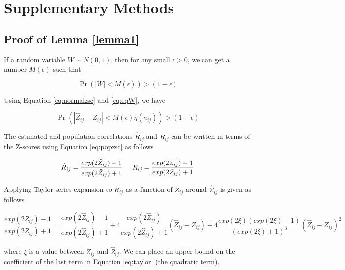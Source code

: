 \section*{Supplementary Methods}

\subsection{Proof of Lemma \ref{lemma1}}

If a random variable $W \sim N \left ( 0, 1 \right) $, then for any small $\epsilon > 0$, we can get a number $M(\epsilon)$ such that 

\begin{equation}\label{eq:eqW}
    \Pr \left ( |W| < M(\epsilon) \right) > (1 - \epsilon)
\end{equation}

Using Equation \ref{eq:normalzsc} and \ref{eq:eqW}, we have 

\begin{equation}\label{eq:zM}
   \Pr \left ( |\hat{Z}_{ij} - Z_{ij} | < M(\epsilon) \eta(n_{ij}) \right) > \left ( 1 - \epsilon \right)
\end{equation}

The estimated and population correlations $\hat{R}_{ij}$ and $R_{ij}$ can be written in terms of the Z-scores using Equation \ref{eq:popzsc} as follows

\begin{equation}\label{eq:Rbound}
    \hat{R}_{ij} =  \frac{exp(2 \hat{Z}_{ij}) - 1 }{exp(2 \hat{Z}_{ij}) + 1} \hspace{0.5 cm} R_{ij} = \frac{exp(2 Z_{ij}) - 1 }{exp(2 Z_{ij}) + 1}
\end{equation}

Applying Taylor series expansion to $R_{ij}$ as a function of $Z_{ij}$ around $\hat{Z}_{ij}$ is given as follows 

\begin{equation}\label{eq:taylor}
    \frac{exp(2 Z_{ij}) - 1 }{exp(2 Z_{ij}) + 1}  =  \frac{exp(2 \hat{Z}_{ij}) - 1 }{exp(2 \hat{Z}_{ij}) + 1} + 4 \frac{exp(2 \hat{Z}_{ij})}{exp(2 \hat{Z}_{ij}) + 1} (\hat{Z}_{ij} - Z_{ij}) + 4 \frac{exp(2\xi){\left (exp(2\xi) - 1 \right )}}{\left (exp(2\xi) + 1 \right )^3} (\hat{Z}_{ij} - Z_{ij})^2
\end{equation}

where $\xi$ is a value between $Z_{ij}$ and $\hat{Z}_{ij}$. We can place an upper bound on the coefficient of the last term in Equation \ref{eq:taylor} (the quadratic term).

